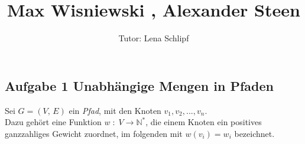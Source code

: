 \documentclass[11pt,a4paper,ngerman]{article}
\author{Tutor: Lena Schlipf}
\date{}
\title{Max Wisniewski , Alexander Steen}
\begin{document}

\maketitle
\thispagestyle{fancy}

\subsection*{Aufgabe 1 \mdseries Unabhängige Mengen in Pfaden}

Sei $G = \left( V ,\, E \right) $ ein \emph{Pfad}, mit den Knoten $v_1, v_2, ..., v_n$.\\
Dazu gehört eine Funktion $w \; : \; V \longrightarrow \mathbb{N}^*$, die einem Knoten ein positives ganzzahliges Gewicht zuordnet, im folgenden mit $w(v_i) = w_i$ bezeichnet.
\\
\end{document}
